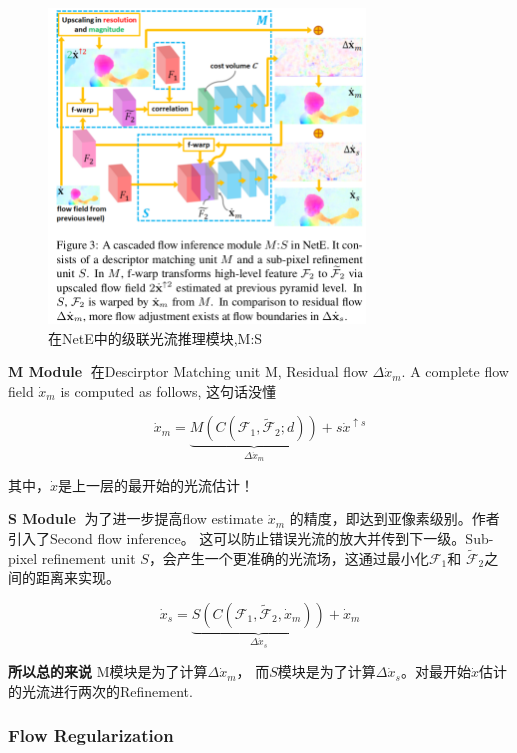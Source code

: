 \begin{figure}[!hbtp]
\centering
\includegraphics[width=0.75\textwidth]{SemanticSLAM/LiteFlowNet1.png}
\caption{在NetE中的级联光流推理模块,M:S}
\label{LiteFlowNet1}
\end{figure}

\textbf{M Module}$\;$  在Descirptor Matching unit M, Residual flow $\varDelta \dot{x}_m$. A complete flow field $\dot{x}_m$ is computed as follows, 这句话没懂

\begin{displaymath}
\dot{x}_m = \underbrace{M(C(\mathcal{F}_1, \tilde{\mathcal{F}}_2; d))}_{\varDelta \dot{x}_m} + s\dot{x}^{\uparrow s}
\end{displaymath}

其中，$\dot{x}$是上一层的最开始的光流估计！

\textbf{S Module}$\;$ 
为了进一步提高flow estimate  $\dot{x}_m$ 的精度，即达到亚像素级别。作者引入了Second flow inference。 这可以防止错误光流的放大并传到下一级。Sub-pixel refinement unit $S$，会产生一个更准确的光流场，这通过最小化$\mathcal{F}_1$和 $\tilde{\mathcal{F}}_2$之间的距离来实现。

\begin{displaymath}
\dot{x}_s = \underbrace{S(C(\mathcal{F}_1, \tilde{\mathcal{F}}_2, \dot{x}_m))}_{\varDelta \dot{x}_s} + \dot{x}_m
\end{displaymath}

{\bfseries 所以总的来说} M模块是为了计算$\varDelta \dot{x}_m$， 而$S$模块是为了计算$\varDelta \dot{x}_s$。对最开始$\dot{x}$估计的光流进行两次的Refinement.

\subsubsection{Flow Regularization}

